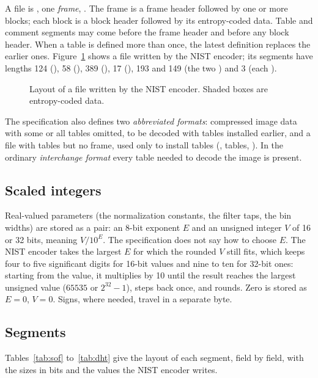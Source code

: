 A file is , one \emph{frame}, . The frame is a frame header followed by
one or more blocks; each block is a block header followed by its entropy-coded data. Table and
comment segments may come before the frame header and before any block header. When a table is
defined more than once, the latest definition replaces the earlier ones. Figure~\ref{fig:stream}
shows a file written by the NIST encoder; its segments have lengths 124 (),
58 (), 389 (), 17 (), 193 and 149 (the two ) and
3 (each ).

\begin{figure}[ht]
  \centering
  
  \caption{Layout of a file written by the NIST encoder. Shaded boxes are entropy-coded data.}
  \label{fig:stream}
\end{figure}

The specification also defines two \emph{abbreviated formats}: compressed image data with some
or all tables omitted, to be decoded with tables installed earlier, and a file with tables but
no frame, used only to install tables (, tables, ). In the ordinary
\emph{interchange format} every table needed to decode the image is present.

\subsection{Scaled integers}
\label{sec:scaled}

Real-valued parameters (the normalization constants, the filter taps, the bin widths) are
stored as a pair: an 8-bit exponent $E$ and an unsigned integer $V$ of 16 or 32 bits, meaning
$V/10^E$. The specification does not say how to choose $E$. The NIST encoder takes the largest
$E$ for which the rounded $V$ still fits, which keeps four to five significant digits for 16-bit
values and nine to ten for 32-bit ones: starting from the value, it multiplies by 10 until the
result reaches the largest unsigned value ($65535$ or $2^{32}-1$), steps back once, and rounds.
Zero is stored as $E = 0$, $V = 0$. Signs, where needed, travel in a separate byte.

\subsection{Segments}

Tables~\ref{tab:sof} to~\ref{tab:dht} give the layout of each segment, field by field, with
the sizes in bits and the values the NIST encoder writes.

